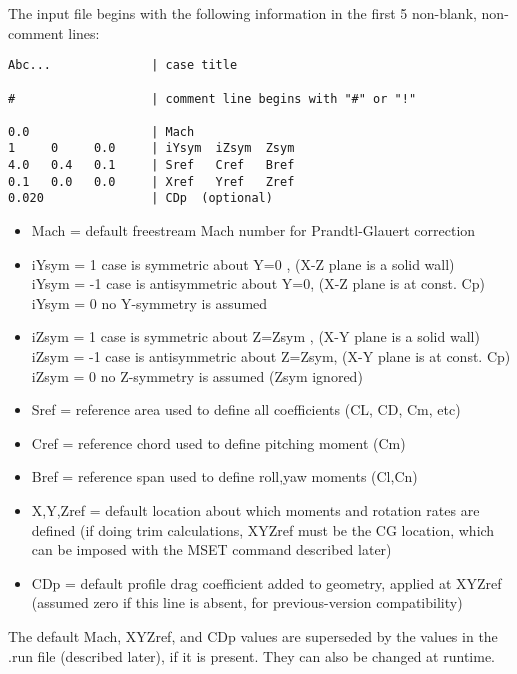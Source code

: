 The input file begins with the following information in the first 5 non-blank,
non-comment lines:

\begin{lstlisting}
Abc...              | case title

#                   | comment line begins with "#" or "!"

0.0                 | Mach
1     0     0.0     | iYsym  iZsym  Zsym
4.0   0.4   0.1     | Sref   Cref   Bref
0.1   0.0   0.0     | Xref   Yref   Zref
0.020               | CDp  (optional)
\end{lstlisting}

\begin{itemize}
	\item Mach  = default freestream Mach number for Prandtl-Glauert correction
	
	\item iYsym =  1  case is symmetric about Y=0  , (X-Z plane is a solid wall) \\
	iYsym = -1  case is antisymmetric about Y=0, (X-Z plane is at const. Cp) \\
	iYsym =  0  no Y-symmetry is assumed
	
	\item iZsym =  1  case is symmetric about Z=Zsym    , (X-Y plane is a solid wall) \\
	iZsym = -1  case is antisymmetric about Z=Zsym, (X-Y plane is at const. Cp) \\
	iZsym =  0  no Z-symmetry is assumed (Zsym ignored)
	
	\item Sref  = reference area  used to define all coefficients (CL, CD, Cm, etc)
	\item Cref  = reference chord used to define pitching moment (Cm)
	\item Bref  = reference span  used to define roll,yaw moments (Cl,Cn)
	
	\item X,Y,Zref = default location about which moments and rotation rates are defined
	(if doing trim calculations, XYZref must be the CG location,
	which can be imposed with the MSET command described later)
	
	\item CDp = default profile drag coefficient added to geometry, applied at XYZref
	(assumed zero if this line is absent, for previous-version compatibility)
\end{itemize}


The default Mach, XYZref, and CDp values are superseded by the values 
in the .run file (described later), if it is present.  They can also
be changed at runtime.

